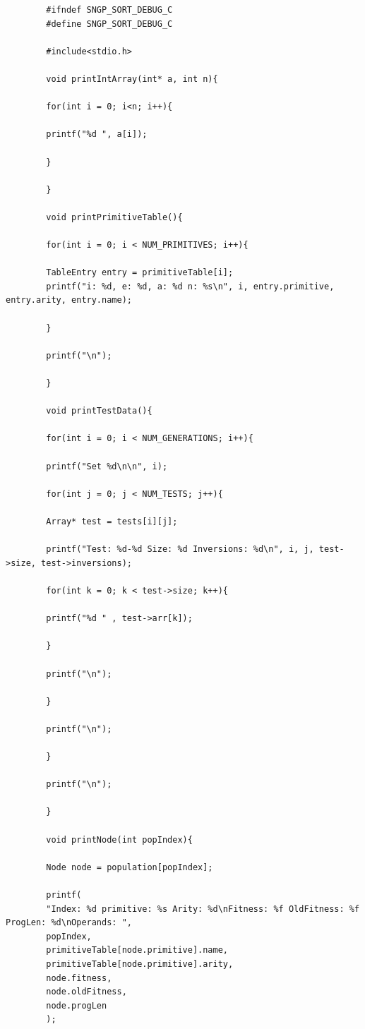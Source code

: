\documentclass{article}
\begin{document}
	    \begin{lstlisting}
	    #ifndef SNGP_SORT_DEBUG_C
	    #define SNGP_SORT_DEBUG_C
	    
	    #include<stdio.h>
	    
	    void printIntArray(int* a, int n){
	    
	    for(int i = 0; i<n; i++){
	    
	    printf("%d ", a[i]);
	    
	    }
	    
	    }
	    
	    void printPrimitiveTable(){
	    
	    for(int i = 0; i < NUM_PRIMITIVES; i++){
	    
	    TableEntry entry = primitiveTable[i];
	    printf("i: %d, e: %d, a: %d n: %s\n", i, entry.primitive, entry.arity, entry.name);
	    
	    }
	    
	    printf("\n");
	    
	    }
	    
	    void printTestData(){
	    
	    for(int i = 0; i < NUM_GENERATIONS; i++){
	    
	    printf("Set %d\n\n", i);
	    
	    for(int j = 0; j < NUM_TESTS; j++){
	    
	    Array* test = tests[i][j];
	    
	    printf("Test: %d-%d Size: %d Inversions: %d\n", i, j, test->size, test->inversions);
	    
	    for(int k = 0; k < test->size; k++){
	    
	    printf("%d " , test->arr[k]);
	    
	    }
	    
	    printf("\n");
	    
	    }
	    
	    printf("\n");
	    
	    }
	    
	    printf("\n");
	    
	    }
	    
	    void printNode(int popIndex){
	    
	    Node node = population[popIndex];
	    
	    printf(
	    "Index: %d primitive: %s Arity: %d\nFitness: %f OldFitness: %f ProgLen: %d\nOperands: ", 
	    popIndex,
	    primitiveTable[node.primitive].name,
	    primitiveTable[node.primitive].arity,
	    node.fitness,
	    node.oldFitness,
	    node.progLen
	    );
	    

\end{lstlisting}
\end{document}
